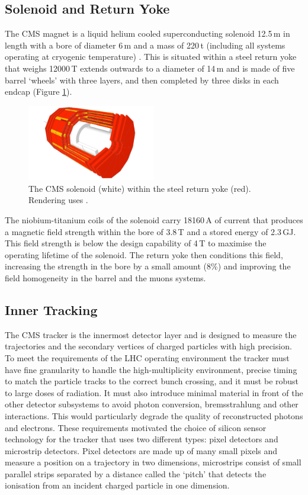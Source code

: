 \subsection{Solenoid and Return Yoke}

The CMS magnet is a liquid helium cooled superconducting solenoid 12.5\,m in length with a bore of diameter 6\,m and a mass of 220\,t (including all systems operating at cryogenic temperature) \cite{CMSPhysics}. 
This is situated within a steel return yoke \cite{Yoke} that weighs 12000\,T extends outwards to a diameter of 14\,m and is made of five barrel `wheels' with three layers, and then completed by three disks in each endcap (Figure \ref{fig:apparatus:solenoid_yoke}).
\begin{figure}[h!]
    \includegraphics[width=0.5\textwidth]{figures/apparatus/solenoid_yoke.pdf}
    \caption{The CMS solenoid (white) within the steel return yoke (red). Rendering uses \cite{SketchupCMS}.}
    \label{fig:apparatus:solenoid_yoke}
\end{figure}
The niobium-titanium coils of the solenoid carry 18160\,A of current that produces a magnetic field strength within the bore of 3.8\,T and a stored energy of 2.3\,GJ. 
This field strength is below the design capability of 4\,T to maximise the operating lifetime of the solenoid.
The return yoke then conditions this field, increasing the strength in the bore by a small amount (8\%) \cite{Yoke} and improving the field homogeneity in the barrel and the muons systems. 


\subsection{Inner Tracking}

The CMS tracker \cite{CMSTrackerTDR} is the innermost detector layer and is designed to measure the trajectories and the secondary vertices of charged particles with high precision. 
To meet the requirements of the LHC operating environment the tracker must have fine granularity to handle the high-multiplicity environment, precise timing to match the particle tracks to the correct bunch crossing, and it must be robust to large doses of radiation.
It must also introduce minimal material in front of the other detector subsystems to avoid photon conversion, bremsstrahlung and other interactions. This would particularly degrade the quality of reconstructed photons and electrons. 
These requirements motivated the choice of silicon sensor technology for the tracker that uses two different types: pixel detectors and microstrip detectors. Pixel detectors are made up of many small pixels and measure a position on a trajectory in two dimensions, microstrips consist of small parallel strips separated by a distance called the `pitch' that detects the ionisation from an incident charged particle in one dimension. 


